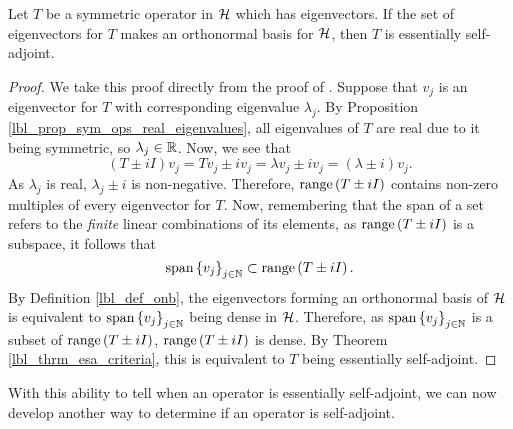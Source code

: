\begin{corollary}\label{lbl_corollary_sym_with_eigenvectors_onb_is_esa}
  Let $T$ be a symmetric operator in $\mathcal{H}$ which has eigenvectors. If the set of eigenvectors for $T$ makes an orthonormal basis for $\mathcal{H}$, then $T$ is essentially self-adjoint.
\end{corollary}
\begin{proof}
  We take this proof directly from the proof of {\cite[Example 9.25]{Hall2013}}. Suppose that $v_j$ is an eigenvector for $T$ with corresponding eigenvalue $\lambda_j$. By Proposition \eqref{lbl_prop_sym_ops_real_eigenvalues}, all eigenvalues of $T$ are real due to it being symmetric, so $\lambda_j \in \mathbb{R}$. Now, we see that
  \begin{equation*}
    (T \pm iI)v_j = Tv_j \pm i v_j = \lambda v_j \pm i v_j = (\lambda \pm i)v_j.
  \end{equation*}
  As $\lambda_j$ is real, $\lambda_j \pm i$ is non-negative. Therefore, $\operatorname{range}\left(T \pm iI\right)$ contains non-zero multiples of every eigenvector for $T$. Now, remembering that the span of a set refers to the {\emph{finite}} linear combinations of its elements, as $\operatorname{range}\left(T \pm i I\right)$ is a subspace, it follows that
  \begin{equation*}
    \text{span}\left\{v_j\right\}_{j \in \mathbb{N}}
    \subset
    \operatorname{range}\left(T \pm iI\right).
  \end{equation*}
  By Definition \eqref{lbl_def_onb}, the eigenvectors forming an orthonormal basis of $\mathcal{H}$ is equivalent to $\text{span}\left\{v_j\right\}_{j \in \mathbb{N}}$ being dense in $\mathcal{H}$. Therefore, as $\text{span}\left\{v_j\right\}_{j \in \mathbb{N}}$ is a subset of $\operatorname{range}\left(T  \pm i I\right)$, $\operatorname{range}\left(T \pm i I\right)$ is dense. By Theorem \eqref{lbl_thrm_esa_criteria}, this is equivalent to $T$ being essentially self-adjoint.
\end{proof}

With this ability to tell when an operator is essentially self-adjoint, we can now develop another way to determine if an operator is self-adjoint.


